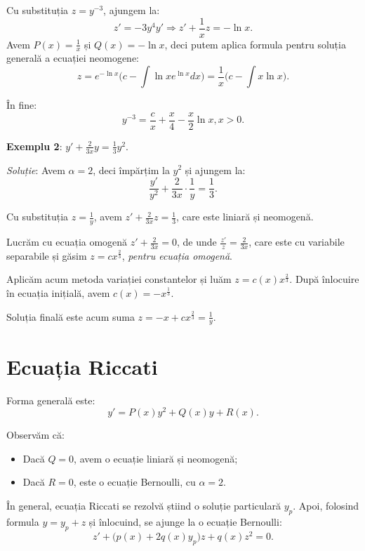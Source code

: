 \documentclass[11pt,a4paper]{article}
\theoremstyle{dotless}
\theoremstyle{dotlessdr}
\begin{document}
Cu substituția $z = y^{-3}$, ajungem la:
\[
  z' = - 3y^4 y' \Rightarrow z' + \frac{1}{x} z = -\ln x.
\]
Avem $P(x) = \frac{1}{x}$ și $Q(x) = -\ln x$, deci putem aplica formula pentru
soluția generală a ecuației neomogene:
\[
  z = e^{-\ln x} \Big( c - \int \ln x e^{\ln x} dx \Big) = \frac{1}{x} \Big( c - \int x \ln x \Big).
\]

În fine:
\[
  y^{-3} = \frac{c}{x} + \frac{x}{4} - \frac{x}{2} \ln x, x > 0.
\]

\vspace{1cm}

\textbf{Exemplu 2}: $y' + \frac{2}{3x}y = \frac{1}{3} y^2$.

\emph{Soluție}: Avem $\alpha = 2$, deci împărțim la $y^2$ și ajungem la:
\[
  \frac{y'}{y^2} + \frac{2}{3x} \cdot \frac{1}{y} = \frac{1}{3}.
\]

Cu substituția $z = \frac{1}{y}$, avem $z' + \frac{2}{3x} z = \frac{1}{3}$,
care este liniară și neomogenă.

Lucrăm cu ecuația omogenă $z' + \frac{2}{3x} = 0$, de unde $\frac{z'}{z} = \frac{2}{3x}$,
care este cu variabile separabile și găsim $z = cx^{\frac{2}{3}}$, \emph{pentru ecuația omogenă}.

Aplicăm acum metoda variației constantelor și luăm $z = c(x) x^{\frac{2}{3}}$. După înlocuire
în ecuația inițială, avem $c(x) = -x^{\frac{1}{3}}$.

Soluția finală este acum suma $z = -x + cx^{\frac{2}{3}} = \frac{1}{y}$.


\section{Ecuația Riccati}
\label{sec:ec-ric}

Forma generală este:
\[
  y' = P(x) y^2 + Q(x) y + R(x).
\]

Observăm că:
\begin{itemize}
\item Dacă $Q = 0$, avem o ecuație liniară și neomogenă;
\item Dacă $R = 0$, este o ecuație Bernoulli, cu $\alpha = 2$.
\end{itemize}
  
În general, ecuația Riccati se rezolvă știind o soluție particulară $y_p$. Apoi,
folosind formula $y = y_p + z$ și înlocuind, se ajunge la o ecuație Bernoulli:
\[
  z' + \big(p(x) + 2q(x) y_p\big)z + q(x) z^2 = 0.
\]
\end{document}
